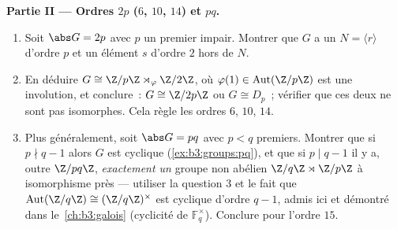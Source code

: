 \begin{problem}
\medskip
\noindent\textbf{Partie II --- Ordres $2p$ ($6$, $10$, $14$) et
$pq$.}
\begin{enumerate}[resume]
  \item Soit $\abs G = 2p$ avec $p$ un premier impair. Montrer que
        $G$ a un  $N = \langle r \rangle$ d'ordre
        $p$ et un élément $s$ d'ordre $2$ hors de $N$.
  \item En déduire $G \cong \Z/p\Z \rtimes_\varphi \Z/2\Z$, où
        $\varphi(1) \in \operatorname{Aut}(\Z/p\Z)$ est une
        involution, et conclure~: $G \cong \Z/2p\Z$ ou $G \cong
        D_p$~; vérifier que ces deux ne sont pas isomorphes. Cela
        règle les ordres $6$, $10$, $14$.
  \item Plus généralement, soit $\abs G = pq$ avec $p < q$
        premiers. Montrer que si $p \nmid q-1$ alors $G$ est
        cyclique (\cref{ex:b3:groups:pq}), et que si $p \mid q -
        1$ il y a, outre $\Z/pq\Z$, \emph{exactement un} groupe
        non abélien $\Z/q\Z \rtimes \Z/p\Z$ à isomorphisme près
        --- utiliser la question 3 et le fait que
        $\operatorname{Aut}(\Z/q\Z) \cong (\Z/q\Z)^\times$ est
        cyclique d'ordre $q - 1$, admis ici et démontré dans
        le~\cref{ch:b3:galois} (cyclicité de $\mathbb
        F_q^\times$). Conclure pour l'ordre $15$.
\end{enumerate}


\end{problem}
